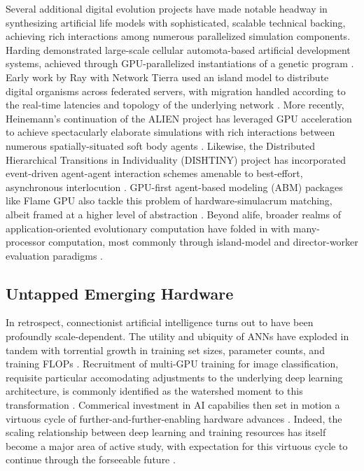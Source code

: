Several additional digital evolution projects have made notable headway in synthesizing artificial life models with sophisticated, scalable technical backing, achieving rich interactions among numerous parallelized simulation components.
Harding demonstrated large-scale cellular automota-based artificial development systems, achieved through GPU-parallelized instantiations of a genetic program  \citep{harding2007fast_ieee}.
Early work by Ray with Network Tierra used an island model to distribute digital organisms across federated servers, with migration handled according to the real-time latencies and topology of the underlying network \citep{ray1995proposal}.
More recently, Heinemann's continuation of the ALIEN project has leveraged GPU acceleration to achieve spectacularly elaborate simulations with rich interactions between numerous spatially-situated soft body agents \citep{heinemann2008artificial}.
Likewise, the Distributed Hierarchical Transitions in Individuality (DISHTINY) project has incorporated event-driven agent-agent interaction schemes amenable to best-effort, asynchronous interlocution \citep{moreno2022exploring,moreno2021conduit}.
GPU-first agent-based modeling (ABM) packages like Flame GPU also tackle this problem of hardware-simulacrum matching, albeit framed at a higher level of abstraction \citep{richmond2010high}.
Beyond alife, broader realms of application-oriented evolutionary computation have folded in with many-processor computation, most commonly through island-model and director-worker evaluation paradigms \citep{abdelhafez2019performance,cantu2001master}.



\subsection{Untapped Emerging Hardware}

In retrospect, connectionist artificial intelligence turns out to have been profoundly scale-dependent.
The utility and ubiquity of ANNs have exploded in tandem with torrential growth in training set sizes, parameter counts, and training FLOPs \citep{marcus2018deep}.
Recruitment of multi-GPU training for image classification, requisite particular accomodating adjustments to the underlying deep learning architecture, is commonly identified as the watershed moment to this transformation
 \citep{krizhevsky2012imagenet}.
Commerical investment in AI capabilies then set in motion a virtuous cycle of further-and-further-enabling hardware advances \citep{jouppi2017datacenter}.
Indeed, the scaling relationship between deep learning and training resources has itself become a major area of active study, with expectation for this virtuous cycle to continue through the forseeable future \citep{kaplan2020scaling}.

